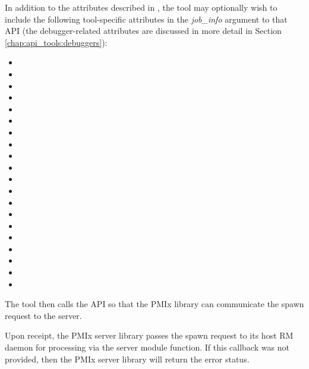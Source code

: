 In addition to the attributes described in , the tool may optionally wish to include the following tool-specific attributes in the \emph{job_info} argument to that \ac{API} (the debugger-related attributes are discussed in more detail in Section \ref{chap:api_tools:debuggers}):

\begin{itemize}
    \item {}
    \item {}
    \item {}
    \item {}
    \item {}
    \item {}
    \item {}
    \item {}
    \item {}
    \item {}
    \item {}
    \item {}
    \item {}
    \item {}
    \item {}
    \item {}
    \item {}
    \item {}
    \item {}
    \item {}
\end{itemize}

The tool then calls the  \ac{API} so that the \ac{PMIx} library can communicate the spawn request to the server.

Upon receipt, the \ac{PMIx} server library passes the spawn request to its host \ac{RM} daemon for processing via the  server module function. If this callback was not provided, then the \ac{PMIx} server library will return the  error status.

